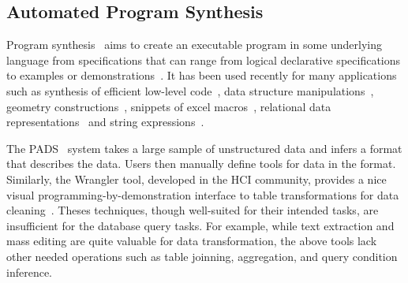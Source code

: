 



\subsection{Automated Program Synthesis }


Program synthesis~\cite{Gulwani:2010:DPS} aims to create an executable program
in some underlying language from specifications that can range
from logical declarative specifications to examples or
demonstrations~\cite{Harris:2011, singh:2012, Gulwani:2011,
Kandel:2011, Fisher08Pads,Lau:2003:PDU, Lau:2000:VSA, Barbosa:2010:MLA, Arasu:2009:LST}.
It has been used recently for many applications
such as synthesis of efficient low-level code~\cite{Solar-Lezama:2005},
data structure manipulations~\cite{Fisher:2008},
geometry constructions~\cite{Gulwani:2011:SGC},
snippets of excel macros~\cite{Harris:2011},
relational data representations~\cite{Barbosa:2010:MLA, Arasu:2009:LST} and string
expressions~\cite{singh:2012, Gulwani:2011}.


The PADS~\cite{Fisher:2008} system takes a large sample
of unstructured data and infers a
format that describes the data. Users then manually
define tools for data in the format.
Similarly, the Wrangler tool, developed in the HCI community,
provides a nice visual programming-by-demonstration
interface to table transformations for data cleaning~\cite{Kandel:2011}.
Theses techniques, though well-suited for their intended tasks,
are insufficient for the database query tasks.
For example, while text extraction and mass editing
are quite valuable for data transformation, the above tools
lack other needed operations such as table joinning,
aggregation, and query condition inference.


